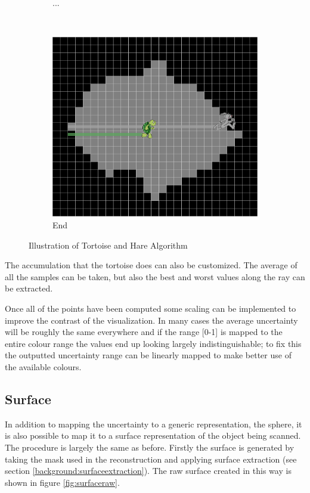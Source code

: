 \begin{figure}[H]
\begin{subfigure}[b]{0.32\textwidth}
    \caption*{...}
    \label{fig:tortoiseandhare2}
  \end{subfigure}%
  ~ %
  \begin{subfigure}[b]{0.32\textwidth}
    \includegraphics[width=\textwidth]{images/surface/tortoise_and_hare_3.png}
    \caption*{End}
    \label{fig:tortoiseandhare3}  
  \end{subfigure}
  \caption{Illustration of Tortoise and Hare Algorithm}\label{fig:tortoiseandhareexample}
\end{figure}

The accumulation that the tortoise does can also be customized. The average of all the samples can be taken, but also the best and worst values along the ray can be extracted.

Once all of the points have been computed some scaling can be implemented to improve the contrast of the visualization. In many cases the average uncertainty will be roughly the same everywhere and if the range [0-1] is mapped to the entire colour range the values end up looking largely indistinguishable; to fix this the outputted uncertainty range can be linearly mapped to make better use of the available colours.


\subsection{Surface}\label{method:surface}
In addition to mapping the uncertainty to a generic representation, the sphere, it is also possible to map it to a surface representation of the object being scanned. The procedure is largely the same as before. Firstly the surface is generated by taking the mask used in the reconstruction and applying surface extraction (see section \ref{background:surfaceextraction}). The raw surface created in this way is shown in figure \ref{fig:surfaceraw}.

